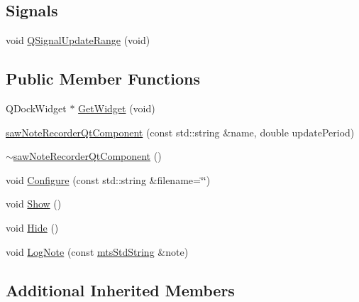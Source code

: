 \subsection*{Signals}
\begin{DoxyCompactItemize}
\item 
void \hyperlink{classsaw_note_recorder_qt_component_a2d912cf45c405aa577dff2a2debb22c1}{Q\-Signal\-Update\-Range} (void)
\end{DoxyCompactItemize}
\subsection*{Public Member Functions}
\begin{DoxyCompactItemize}
\item 
Q\-Dock\-Widget $\ast$ \hyperlink{classsaw_note_recorder_qt_component_a0270c27baaa6259bd9eac3be867b5d1a}{Get\-Widget} (void)
\item 
\hyperlink{classsaw_note_recorder_qt_component_abbd0f321c7abb67ce72d877707ecb38f}{saw\-Note\-Recorder\-Qt\-Component} (const std\-::string \&name, double update\-Period)
\item 
\hyperlink{classsaw_note_recorder_qt_component_a2626675183bd2287aa87b17362857a7f}{$\sim$saw\-Note\-Recorder\-Qt\-Component} ()
\item 
void \hyperlink{classsaw_note_recorder_qt_component_a11d04fea3bde8e8f2a918ac1efa3306f}{Configure} (const std\-::string \&filename=\char`\"{}\char`\"{})
\item 
void \hyperlink{classsaw_note_recorder_qt_component_ae8117d1f54c12aa799081ccbdddbfbbc}{Show} ()
\item 
void \hyperlink{classsaw_note_recorder_qt_component_af6b2b5f0cd3f81623385ad7f58d1efe0}{Hide} ()
\item 
void \hyperlink{classsaw_note_recorder_qt_component_a9c635636528fdcee50f97f7c4bff4996}{Log\-Note} (const \hyperlink{mts_generic_object_proxy_8h_adbc21bfbf98367e582bf8a263b7e711f}{mts\-Std\-String} \&note)
\end{DoxyCompactItemize}
\subsection*{Additional Inherited Members}


